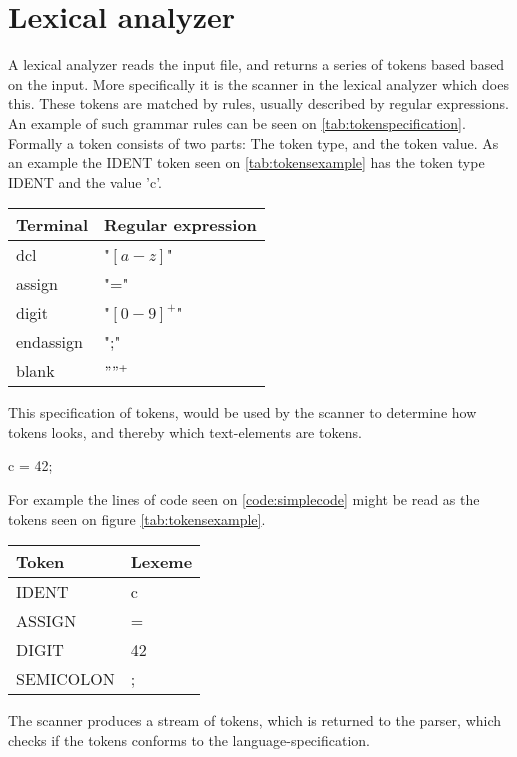 


\section{Lexical analyzer}
A lexical analyzer reads the input file, and returns a series of tokens based based on the input. More specifically it is the scanner in the lexical analyzer which does this. These tokens are matched by rules, usually described by regular expressions. An example of such grammar rules can be seen on \ref{tab:tokenspecification}. Formally a token consists of two parts: The token type, and the token value. As an example the IDENT token seen on \ref{tab:tokensexample} has the token type IDENT and the value 'c'. 

\begin{tabular}{|l|l|}
\label{tab:tokenspecification}
    	Terminal  	& Regular expression 	\\ \hline
    	dcl       	& "$[a-z]$"      			\\ 
    	assign    	& "="      				\\ 
    	digit     	& "$[0-9]^+$"   			\\ 
    	endassign 	& ";"      				\\
    	blank 		& $" "^+$					\\
    \hline
\end{tabular}
This specification of tokens, would be used by the scanner to determine how tokens looks, and thereby which text-elements are tokens. 

\begin{code}
c = 42;
\end{code}

For example the lines of code seen on \ref{code:simplecode} might be read as the tokens seen on figure \ref{tab:tokensexample}.
\begin{tabular}{|l|l|}
\label{tab:tokensexample}
	\hline
    Token     & Lexeme \\ \hline
    IDENT     & c      \\ 
    ASSIGN    & =      \\ 
    DIGIT     & 42     \\ 
    SEMICOLON & ;      \\
    \hline
\end{tabular}

The scanner produces a stream of tokens, which is returned to the parser, which checks if the tokens conforms to the language-specification.
